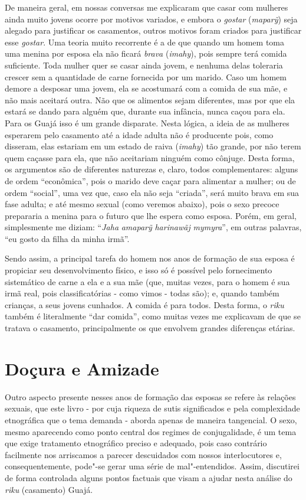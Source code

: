 De maneira geral, em nossas conversas me explicaram que casar com
mulheres ainda muito jovens ocorre por motivos variados, e embora o
\emph{gostar} (\emph{maparỹ}) seja alegado para justificar os
casamentos, outros motivos foram criados para justificar esse
\emph{gostar}. Uma teoria muito recorrente é a de que quando um homem
toma uma menina por esposa ela não ficará \emph{brava} (\emph{imahy}),
pois sempre terá comida suficiente. Toda mulher quer se casar ainda
jovem, e nenhuma delas toleraria crescer sem a quantidade de carne
fornecida por um marido. Caso um homem demore a desposar uma jovem, ela
se acostumará com a comida de sua mãe, e não mais aceitará outra. Não
que os alimentos sejam diferentes, mas por que ela estará se dando para
alguém que, durante sua infância, nunca caçou para ela. Para os Guajá
isso é um grande disparate. Nesta lógica, a ideia de as mulheres
esperarem pelo casamento até a idade adulta não é producente pois, como
disseram, elas estariam em um estado de raiva (\emph{imahy}) tão grande,
por não terem quem caçasse para ela, que não aceitariam ninguém como
cônjuge. Desta forma, os argumentos são de diferentes naturezas e,
claro, todos complementares: alguns de ordem ``econômica'', pois o marido
deve caçar para alimentar a mulher; ou de ordem ``social'', uma vez que,
caso ela não seja ``criada'', será muito brava em sua fase adulta; e até
mesmo sexual (como veremos abaixo), pois o sexo precoce prepararia a
menina para o futuro que lhe espera como esposa. Porém, em geral,
simplesmente me diziam: ``\emph{Jaha} \emph{amaparỹ} \emph{harinawãj}
\emph{mymyra}'', em outras palavras, ``eu gosto da filha da minha irmã''.

Sendo assim, a principal tarefa do homem nos anos de formação de sua
esposa é propiciar seu desenvolvimento físico, e isso só é possível pelo
fornecimento sistemático de carne a ela e a sua mãe (que, muitas vezes,
para o homem é sua irmã real, pois classificatórias - como vimos - todas
são); e, quando também crianças, a seus jovens cunhados. A comida é para
todos. Desta forma, o \emph{riku} também é literalmente ``dar comida'',
como muitas vezes me explicavam de que se tratava o casamento,
principalmente os que envolvem grandes diferenças etárias.

\section{Doçura e Amizade}\label{douxe7ura-e-amizade}

Outro aspecto presente nesses anos de formação das esposas se refere às
relações sexuais, que este livro - por cuja riqueza de sutis
significados e pela complexidade etnográfica que o tema demanda - aborda
apenas de maneira tangencial. O sexo, mesmo aparecendo como ponto
central dos regimes de conjugalidade, é um tema que exige tratamento
etnográfico preciso e adequado, pois caso contrário facilmente nos
arriscamos a parecer descuidados com nossos interlocutores e,
consequentemente, pode"-se gerar uma série de mal"-entendidos. Assim,
discutirei de forma controlada alguns pontos factuais que visam a ajudar
nesta análise do \emph{riku} (casamento) Guajá.

